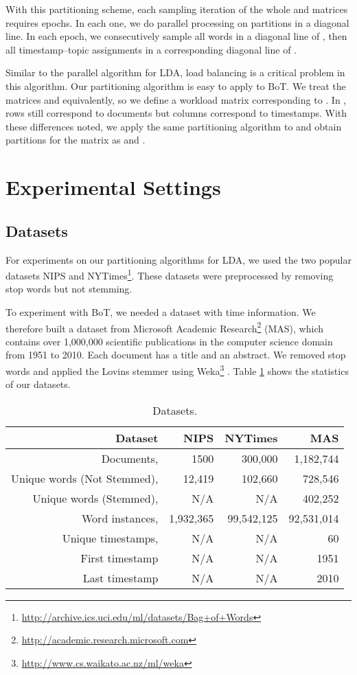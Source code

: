 \documentclass[10pt,conference]{IEEEtran}
\begin{document}
With this partitioning scheme, each sampling iteration of the whole  and  matrices requires  epochs. In each one, we do parallel processing on partitions in a diagonal line. In each epoch, we consecutively sample all words in a diagonal line of , then all timestamp--topic assignments in a corresponding diagonal line of .

Similar to the parallel algorithm for LDA, load balancing is a critical problem in this algorithm. Our partitioning algorithm is easy to apply to BoT. We treat the matrices  and  equivalently, so we define a workload matrix  corresponding to . In , rows still correspond to documents but columns correspond to timestamps. With these differences noted, we apply the same partitioning algorithm to  and obtain  partitions for the  matrix as  and .

\section{Experimental Settings}
\subsection{Datasets}
For experiments on our partitioning algorithms for LDA, we used the two popular datasets NIPS and NYTimes\footnote{\url{http://archive.ics.uci.edu/ml/datasets/Bag+of+Words}}. These datasets were preprocessed by removing stop words but not stemming.

To experiment with BoT, we needed a dataset with time information. We therefore built a dataset from Microsoft Academic Research\footnote{\url{http://academic.research.microsoft.com}} (MAS), which contains over 1,000,000 scientific publications in the computer science domain from 1951 to 2010. Each document has a title and an abstract. We removed stop words and applied the Lovins stemmer using Weka\footnote{\url{http://www.cs.waikato.ac.nz/ml/weka}} \cite{lovins1968development}. Table \ref{tab:Dataset} shows the statistics of our datasets.

\begin{table}[htbp]
  \centering
  \caption{Datasets.}
    \begin{tabular}{r|r|r|r}
    \hline
    Dataset & NIPS & NYTimes & MAS \\
    \hline
    Documents,  & 1500 & 300,000 & 1,182,744 \\
    Unique words (Not Stemmed),  & 12,419 & 102,660 & 728,546 \\
    Unique words (Stemmed),  & N/A   & N/A   & 402,252 \\
    Word instances,  & 1,932,365 & 99,542,125 & 92,531,014 \\
    Unique timestamps,  & N/A   & N/A   & 60 \\
    First timestamp & N/A   & N/A   & 1951 \\
    Last timestamp & N/A   & N/A   & 2010 \\
	\hline
    \end{tabular}\label{tab:Dataset}\end{table}
\end{document}
